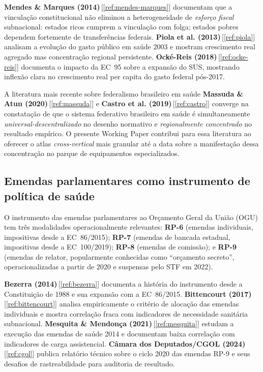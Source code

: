 \documentclass[12pt,a4paper,oneside]{article}
\begin{document}
\textbf{Mendes \& Marques (2014)}\,[\ref{ref:mendes-marques}] documentam
que a vinculação constitucional não eliminou a heterogeneidade de
\textit{esforço fiscal} subnacional: estados ricos cumprem a
vinculação com folga; estados pobres dependem fortemente de
transferências federais. \textbf{Piola et al. (2013)}\,[\ref{ref:piola}]
analisam a evolução do gasto público em saúde 2003 e
mostram crescimento real agregado mas concentração regional
persistente. \textbf{Ocké-Reis (2018)}\,[\ref{ref:ocke-reis}] documenta
o impacto da EC~95 sobre a expansão do SUS, mostrando inflexão clara
no crescimento real per capita do gasto federal pós-2017.

A literatura mais recente sobre federalismo brasileiro em saúde
\textendash{} \textbf{Massuda \& Atun (2020)}\,[\ref{ref:massuda}]
e \textbf{Castro et al. (2019)}\,[\ref{ref:castro}] \textendash{}
converge na constatação de que o sistema federativo brasileiro em
saúde é simultaneamente \textit{universal-descentralizado} no
desenho normativo e \textit{regionalmente concentrado} no resultado
empírico. O presente Working Paper contribui para essa literatura
ao oferecer o atlas \textit{cross-vertical} mais granular até a
data sobre a manifestação dessa concentração no parque de
equipamentos especializados.

\subsection{Emendas parlamentares como instrumento de política de
saúde}\label{sub:lit-emendas}

O instrumento das emendas parlamentares ao Orçamento Geral da União
(OGU) tem três modalidades operacionalmente relevantes:
\textbf{RP-6} (emendas individuais, impositivas desde a EC~86/2015);
\textbf{RP-7} (emendas de bancada estadual, impositivas desde a
EC~100/2019); \textbf{RP-8} (emendas de comissão); e \textbf{RP-9}
(emendas de relator, popularmente conhecidas como ``orçamento
secreto'', operacionalizadas a partir de 2020 e suspensas pelo STF
em 2022).

\textbf{Bezerra (2014)}\,[\ref{ref:bezerra}] documenta a história do
instrumento desde a Constituição de 1988 e sua expansão com a
EC~86/2015. \textbf{Bittencourt (2017)}\,[\ref{ref:bittencourt}]
analisa empiricamente o critério de alocação das emendas individuais
e mostra correlação fraca com indicadores de necessidade
sanitária subnacional. \textbf{Mesquita \& Mendonça
(2021)}\,[\ref{ref:mesquita}] estudam a execução das emendas de
saúde 2014 e documentam baixa correlação com
indicadores de carga assistencial. \textbf{Câmara dos Deputados/CGOL
(2024)}\,[\ref{ref:cgol}] publica relatório técnico sobre o ciclo
2020 das emendas RP-9 e seus desafios de
rastreabilidade para auditoria de resultado.
\end{document}
